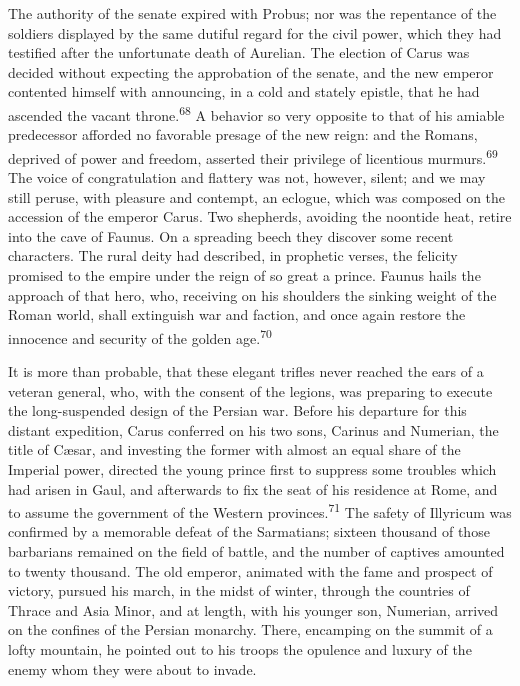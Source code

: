 The authority of the senate expired with Probus; nor was the
repentance of the soldiers displayed by the same dutiful regard
for the civil power, which they had testified after the
unfortunate death of Aurelian. The election of Carus was decided
without expecting the approbation of the senate, and the new
emperor contented himself with announcing, in a cold and stately
epistle, that he had ascended the vacant throne.\textsuperscript{68} A behavior so
very opposite to that of his amiable predecessor afforded no
favorable presage of the new reign: and the Romans, deprived of
power and freedom, asserted their privilege of licentious
murmurs.\textsuperscript{69} The voice of congratulation and flattery was not,
however, silent; and we may still peruse, with pleasure and
contempt, an eclogue, which was composed on the accession of the
emperor Carus. Two shepherds, avoiding the noontide heat, retire
into the cave of Faunus. On a spreading beech they discover some
recent characters. The rural deity had described, in prophetic
verses, the felicity promised to the empire under the reign of so
great a prince. Faunus hails the approach of that hero, who,
receiving on his shoulders the sinking weight of the Roman world,
shall extinguish war and faction, and once again restore the
innocence and security of the golden age.\textsuperscript{70}




It is more than probable, that these elegant trifles never
reached the ears of a veteran general, who, with the consent of
the legions, was preparing to execute the long-suspended design
of the Persian war. Before his departure for this distant
expedition, Carus conferred on his two sons, Carinus and
Numerian, the title of Cæsar, and investing the former with
almost an equal share of the Imperial power, directed the young
prince first to suppress some troubles which had arisen in Gaul,
and afterwards to fix the seat of his residence at Rome, and to
assume the government of the Western provinces.\textsuperscript{71} The safety of
Illyricum was confirmed by a memorable defeat of the Sarmatians;
sixteen thousand of those barbarians remained on the field of
battle, and the number of captives amounted to twenty thousand.
The old emperor, animated with the fame and prospect of victory,
pursued his march, in the midst of winter, through the countries
of Thrace and Asia Minor, and at length, with his younger son,
Numerian, arrived on the confines of the Persian monarchy. There,
encamping on the summit of a lofty mountain, he pointed out to
his troops the opulence and luxury of the enemy whom they were
about to invade.

